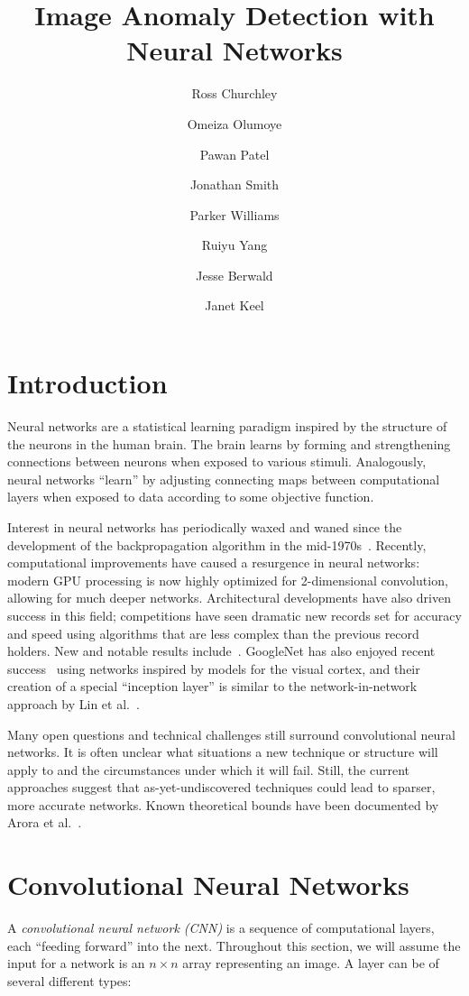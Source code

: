 \documentclass{article}
\title{Image Anomaly Detection with Neural Networks}
\author[1]{Ross Churchley}
\author[2]{Omeiza Olumoye}
\author[3]{Pawan Patel}
\author[4]{Jonathan Smith}
\author[5]{Parker Williams}
\author[3]{Ruiyu Yang}
\author[6]{Jesse Berwald}
\author[6]{Janet Keel}
\affil[1]{Simon Fraser University}
\affil[2]{University of Texas}
\affil[3]{Indiana University}
\affil[4]{Acadia University}
\affil[5]{University of California}
\affil[6]{Target Corporation}
\begin{document}
\maketitle
\onehalfspace
\section{Introduction}
  Neural networks are a statistical learning paradigm inspired by the structure of the neurons in the human brain.  The brain learns by forming and strengthening connections between neurons when exposed to various stimuli. Analogously, neural networks ``learn'' by adjusting connecting maps between computational layers when exposed to data according to some objective function.

  Interest in neural networks has periodically waxed and waned since the development of the backpropagation algorithm in the mid-1970s~\cite{werbos}. Recently, computational improvements have caused a resurgence in neural networks: modern GPU processing is now highly optimized for 2-dimensional convolution, allowing for much deeper networks. Architectural developments have also driven success in this field; competitions have seen dramatic new records set for accuracy and speed using algorithms that are less complex than the previous record holders. New and notable results include~\cite{INC,RFH}. GoogleNet has also enjoyed recent success~\cite{GDWC} using networks inspired by models for the visual cortex, and their creation of a special ``inception layer'' is similar to the network-in-network approach by Lin et al.~\cite{NIN}.

  Many open questions and technical challenges still surround convolutional neural networks. It is often unclear what situations a new technique or structure will apply to and the circumstances under which it will fail.   Still, the current approaches suggest that as-yet-undiscovered techniques could lead to sparser, more accurate networks. Known theoretical bounds have been documented by Arora et al.~\cite{PB}.


\section{Convolutional Neural Networks}

  A \emph{convolutional neural network (CNN)} is a sequence of computational layers, each ``feeding forward'' into the next. Throughout this section, we will assume the input for a network is an $n\times n$ array representing an image. A layer can be of several different types:
\end{document}
